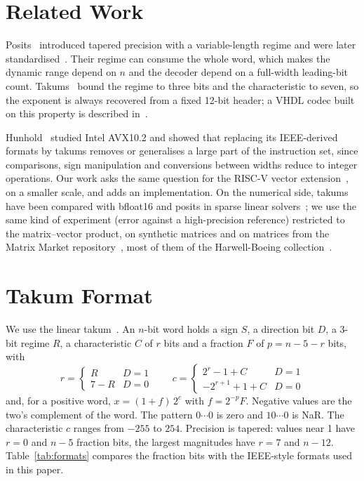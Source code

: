 \documentclass[conference]{IEEEtran}
\begin{document}
\section{Related Work}

Posits~\cite{gustafson2017} introduced tapered precision with a variable-length regime and were later
standardised~\cite{positstd}. Their regime can consume the whole word, which makes the dynamic range
depend on $n$ and the decoder depend on a full-width leading-bit count. Takums~\cite{hunhold2024takum}
bound the regime to three bits and the characteristic to seven, so the exponent is always recovered from
a fixed 12-bit header; a VHDL codec built on this property is described in~\cite{hunhold2024codec}.

Hunhold~\cite{hunhold2025avx} studied Intel AVX10.2 and showed that replacing its IEEE-derived formats
by takums removes or generalises a large part of the instruction set, since comparisons, sign
manipulation and conversions between widths reduce to integer operations. Our work asks the same
question for the RISC-V vector extension~\cite{rvv}, on a smaller scale, and adds an implementation.
On the numerical side, takums have been compared with bfloat16 and posits in sparse linear
solvers~\cite{hunhold2025solvers}; we use the same kind of experiment (error against a high-precision
reference) restricted to the matrix--vector product, on synthetic matrices and on matrices from the
Matrix Market repository~\cite{boisvert1997}, most of them of the Harwell-Boeing collection~\cite{duff1989}.

\section{Takum Format}

We use the linear takum~\cite{hunhold2024takum}. An $n$-bit word holds a sign $S$, a direction bit $D$,
a 3-bit regime $R$, a characteristic $C$ of $r$ bits and a fraction $F$ of $p=n-5-r$ bits, with
\begin{equation}
r=\begin{cases}R & D=1\\ 7-R & D=0\end{cases}\qquad
c=\begin{cases}2^{r}-1+C & D=1\\ -2^{r+1}+1+C & D=0\end{cases}
\end{equation}
and, for a positive word, $x=(1+f)\,2^{c}$ with $f=2^{-p}F$. Negative values are the two's complement
of the word. The pattern $0\cdots0$ is zero and $10\cdots0$ is NaR. The characteristic $c$ ranges from
$-255$ to $254$. Precision is tapered: values near 1 have $r=0$ and $n-5$ fraction bits, the largest
magnitudes have $r=7$ and $n-12$. Table~\ref{tab:formats} compares the fraction bits with the IEEE-style
formats used in this paper.
\end{document}
